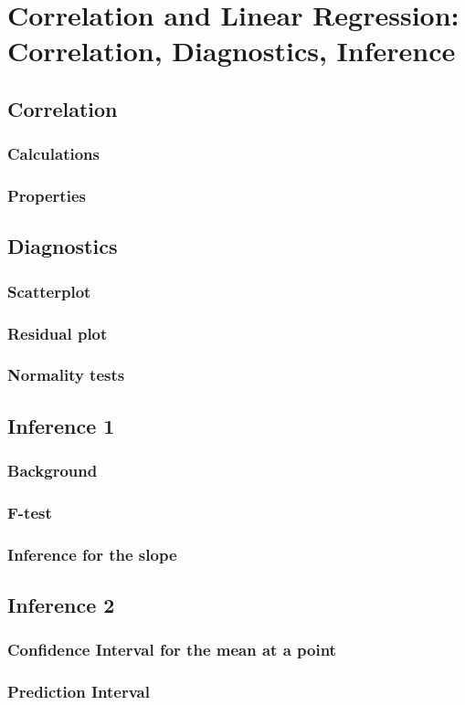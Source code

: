 \chapter{Correlation and Linear Regression: Correlation, Diagnostics, Inference}  %

\section{Correlation}  %
\subsection{Calculations}  %
\subsection{Properties}  %

\section{Diagnostics}  %
\subsection{Scatterplot}  %
\subsection{Residual plot}  %
\subsection{Normality tests}  %

\section{Inference 1}  %
\subsection{Background}  %
\subsection{F-test}  %
\subsection{Inference for the slope}  %

\section{Inference 2}  %
\subsection{Confidence Interval for the mean at a point}  %
\subsection{Prediction Interval}  %
